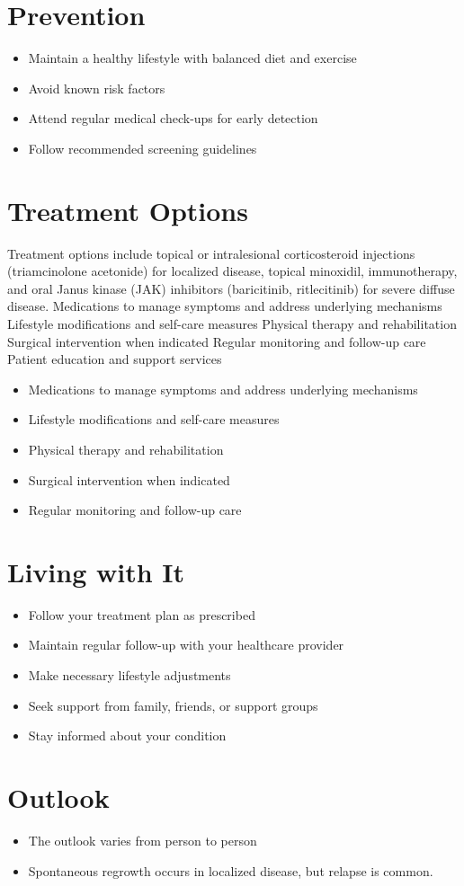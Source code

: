 \section{Prevention}
\begin{itemize}[noitemsep]
  \item Maintain a healthy lifestyle with balanced diet and exercise
  \item Avoid known risk factors
  \item Attend regular medical check-ups for early detection
  \item Follow recommended screening guidelines
\end{itemize}
\section{Treatment Options}
Treatment options include topical or intralesional corticosteroid injections (triamcinolone acetonide) for localized disease, topical minoxidil, immunotherapy, and oral Janus kinase (JAK) inhibitors (baricitinib, ritlecitinib) for severe diffuse disease. Medications to manage symptoms and address underlying mechanisms Lifestyle modifications and self-care measures Physical therapy and rehabilitation Surgical intervention when indicated Regular monitoring and follow-up care Patient education and support services

\begin{itemize}[noitemsep]
  \item Medications to manage symptoms and address underlying mechanisms
  \item Lifestyle modifications and self-care measures
  \item Physical therapy and rehabilitation
  \item Surgical intervention when indicated
  \item Regular monitoring and follow-up care
\end{itemize}
\section{Living with It}
\begin{itemize}[noitemsep]
  \item Follow your treatment plan as prescribed
  \item Maintain regular follow-up with your healthcare provider
  \item Make necessary lifestyle adjustments
  \item Seek support from family, friends, or support groups
  \item Stay informed about your condition
\end{itemize}
\section{Outlook}
\begin{itemize}[noitemsep]
  \item The outlook varies from person to person
  \item Spontaneous regrowth occurs in localized disease, but relapse is common.
\end{itemize}
